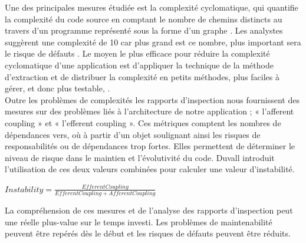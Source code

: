 \documentclass{report}
\begin{document}
        Une des principales mesures étudiée est la complexité cyclomatique, qui quantifie la complexité du code source en comptant le nombre de chemins distincts au travers d'un programme représenté sous la forme d'un graphe \cite{Kan03}. Les analystes suggèrent une complexité de 10 car plus grand est ce nombre, plus important sera le risque de défauts \cite{Wat96}. Le moyen le plus efficace pour réduire la complexité cyclomatique d’une application est d'appliquer la technique de la méthode d'extraction et de distribuer la complexité en petits méthodes, plus faciles à gérer, et donc plus testable, \cite{Duv07}.\\

        Outre les problèmes de complexités les rapports d’inspection nous fournissent des mesures sur des problèmes liés à l’architecture de notre application ; « l’afferent coupling » et « l’efferent coupling ». Ces métriques comptent les nombres de dépendances vers, où à partir d’un objet soulignant ainsi les risques de responsabilités ou de dépendances trop fortes. Elles permettent de déterminer le niveau de risque dans le maintien et l’évolutivité du code. Duvall introduit l'utilisation de ces deux valeurs combinées pour calculer une valeur d'instabilité.\\

        \begin{center}
            $Instability=\frac{EfferentCoupling}{EfferentCoupling + AfferentCoupling}$\\
        \end{center}

        La compréhension de ces mesures et de l'analyse des rapports d'inspection peut une réelle plus-value sur le temps investi. Les problèmes de maintenabilité peuvent être repérés dès le début et les risques de défauts peuvent être réduits.
\end{document}

